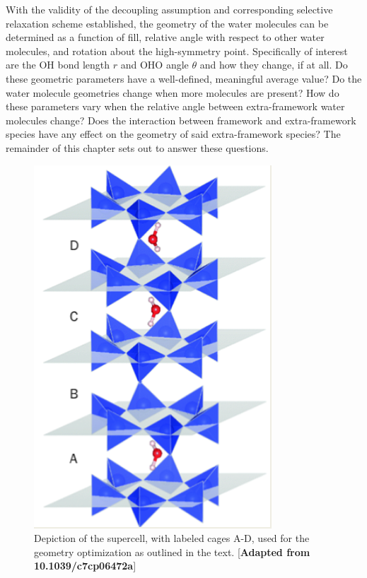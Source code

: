    With the validity of the decoupling assumption and corresponding selective relaxation scheme established, the geometry of the water molecules can be determined as a function of fill, relative angle with respect to other water molecules, and rotation about the high-symmetry point. Specifically of interest are the OH bond length $r$ and OHO angle $\theta$ and how they change, if at all. Do these geometric parameters have a well-defined, meaningful average value? Do the water molecule geometries change when more molecules are present? How do these parameters vary when the relative angle between extra-framework water molecules change? Does the interaction between framework and extra-framework species have any effect on the geometry of said extra-framework species? The remainder of this chapter sets out to answer these questions.
    
    
    \begin{figure}
        \centering
        \includegraphics{Figures/System/geometry_supercell.png}
        \caption{Depiction of the supercell, with labeled cages A-D, used for the geometry optimization as outlined in the text. [\textbf{Adapted from 10.1039/c7cp06472a}]}
        \label{fig:geom_supercell}
    \end{figure}
    
